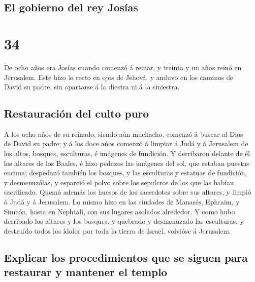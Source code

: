 \hypertarget{el-gobierno-del-rey-josuxedas}{%
\subsection{El gobierno del rey
Josías}\label{el-gobierno-del-rey-josuxedas}}

\hypertarget{section-33}{%
\section{34}\label{section-33}}

 De ocho años era Josías cuando comenzó á reinar, y treinta
y un años reinó en Jerusalem.  Este hizo lo recto en ojos de
Jehová, y anduvo en los caminos de David su padre, sin apartarse á la
diestra ni á la siniestra.

\hypertarget{restauraciuxf3n-del-culto-puro}{%
\subsection{Restauración del culto
puro}\label{restauraciuxf3n-del-culto-puro}}

 A los ocho años de su reinado, siendo aún muchacho, comenzó
á buscar al Dios de David su padre; y á los doce años comenzó á limpiar
á Judá y á Jerusalem de los altos, bosques, esculturas, é imágenes de
fundición.  Y derribaron delante de él los altares de los
Baales, é hizo pedazos las imágenes del sol, que estaban puestas encima;
despedazó también los bosques, y las esculturas y estatuas de fundición,
y desmenuzólas, y esparció el polvo sobre los sepulcros de los que las
habían sacrificado.  Quemó además los huesos de los
sacerdotes sobre sus altares, y limpió á Judá y á Jerusalem.
 Lo mismo hizo en las ciudades de Manasés, Ephraim, y
Simeón, hasta en Nephtalí, con sus lugares asolados alrededor.
 Y como hubo derribado los altares y los bosques, y quebrado
y desmenuzado las esculturas, y destruído todos los ídolos por toda la
tierra de Israel, volvióse á Jerusalem.

\hypertarget{explicar-los-procedimientos-que-se-siguen-para-restaurar-y-mantener-el-templo}{%
\subsection{Explicar los procedimientos que se siguen para restaurar y
mantener el
templo}\label{explicar-los-procedimientos-que-se-siguen-para-restaurar-y-mantener-el-templo}}

